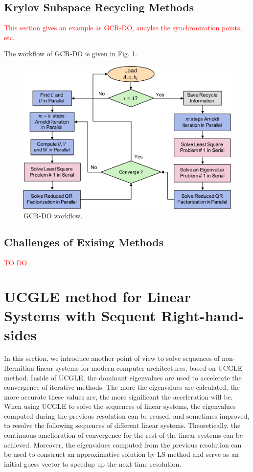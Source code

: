 \subsection{Krylov Subspace Recycling Methods}

\textcolor{red}{This section gives an example as GCR-DO, anaylze the synchronization points, etc.}

The workflow of GCR-DO is given in Fig. \ref{fig:gcrdo}.

\begin{figure}[htbp]
	\centering
	\includegraphics[width=5.in]{fig/gcrdo.pdf}
	\caption{GCR-DO workflow.}
	\label{fig:gcrdo}
\end{figure}

\subsection{Challenges of Exising Methods}

\textcolor{red}{TO DO}

\section{UCGLE method for Linear Systems with Sequent Right-hand-sides}

In this section, we introduce another point of view to solve sequences of non-Hermitian linear systems for modern computer architectures, based on UCGLE method. Inside of UCGLE, the dominant eigenvalues are used to accelerate the convergence of iterative methods. The more the eigenvalues are calculated, the more accurate these values are, the more significant the acceleration will be. When using UCGLE to solve the sequences of linear systems, the eigenvalues computed during the previous resolution can be reused, and sometimes improved, to resolve the following sequences of different linear systems. Theoretically, the continuous amelioration of convergence for the rest of the linear systems can be achieved. Moreover, the eigenvalues computed from the previous resolution can be used to construct an approximative solution by LS method and serve as an initial guess vector to speedup up the next time resolution.

